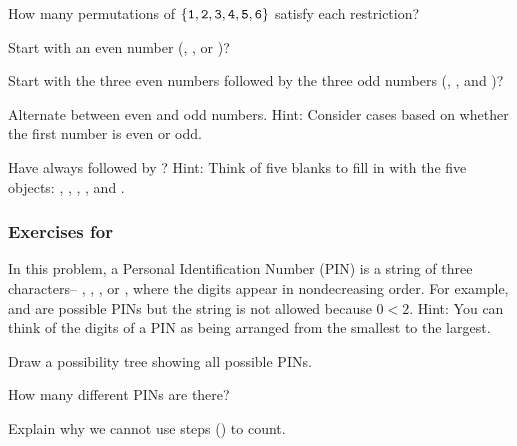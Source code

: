 \begin{exer} [\exerE] %
\label{exer_perms_of_six}
How many permutations of $\{\texttt{1},\texttt{2},\texttt{3},\texttt{4},\texttt{5},\texttt{6}\}$ satisfy each restriction?   
    \begin{exerpart}
         \item Start with an even number (, , or )?
        \item Start with the three even numbers followed by the three odd numbers (, , and )?
        \item Alternate between even and odd numbers.  Hint: Consider cases based on whether the first number is even or odd.
        \item Have  always followed by ?  Hint: Think of five blanks to fill in with the five objects: , , , , and .
    \end{exerpart}
\end{exer}


\subsubsection*{Exercises for  \subcountingawry}

\begin{exer}[\exerP] %
\label{exer_password_not_steps}   
    In this problem, a Personal Identification Number (PIN) is a string of three characters-- , , , or ,  where the digits appear in nondecreasing order.  For example,  and  are possible PINs but the string  is not allowed because $0<2$.  Hint: You can think of the digits of a PIN as being arranged from the smallest to the largest.
        \begin{exerpart}
            \item Draw a possibility tree showing all possible PINs.
            \item How many different PINs are there?
            \item Explain why we cannot use steps () to count.
        \end{exerpart}
\end{exer}


